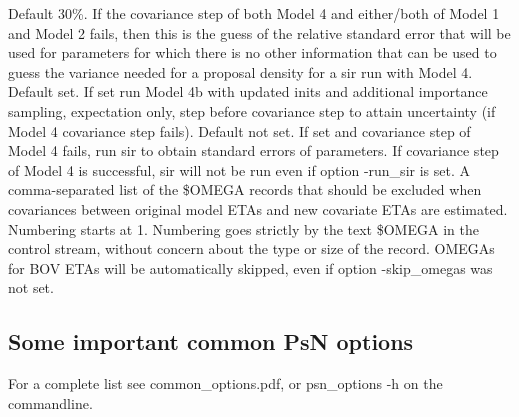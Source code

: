 \begin{optionlist}
\nextopt
{}
Default 30\%.
If the covariance step of both Model 4 and either/both of Model 1 and Model 2 fails, then this is the guess of the
relative standard error that will be used for parameters for which there is no other information that can be used
to guess the variance needed for a proposal density for a sir run with Model 4.
\nextopt
{}
Default set. If set run Model 4b with updated inits and additional importance sampling, expectation only,
step before covariance step to attain uncertainty (if Model 4 covariance step fails).
Default not set. If set and covariance step of Model 4 fails, run sir to obtain standard errors of parameters.
If covariance step of Model 4 is successful, sir will not be run even if option -run\_sir is set.
\nextopt
{}
A comma-separated list of the \$OMEGA records that should be excluded when covariances
between original model ETAs and new covariate ETAs are estimated. Numbering starts at 1.
Numbering goes strictly by the text \$OMEGA in the control stream, without concern
about the type or size of the record. OMEGAs for BOV ETAs will be automatically skipped,
even if option -skip\_omegas was not set.
\nextopt
\end{optionlist}


\subsection{Some important common PsN options}
For a complete list see common\_options.pdf,
or psn\_options -h on the commandline.



